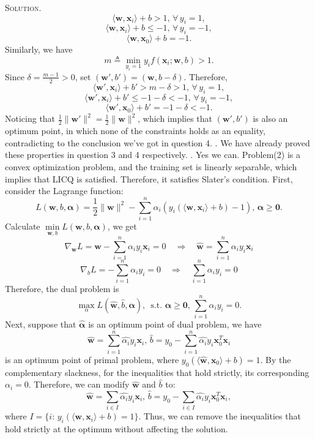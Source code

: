\documentclass[12pt, a4paper, oneside]{ctexart}
\newenvironment{solution}{\par\noindent\textsc{Solution. }}{\\\par}
\begin{document}
\begin{solution}
    \[
    \langle\mathbf{w},\mathbf{x}_i\rangle + b > 1,\, \forall\, y_i = 1,
    \]
    \[
    \langle\mathbf{w},\mathbf{x}_i\rangle + b \leq -1,\, \forall\, y_i = -1,
    \]
    \[
    \langle\mathbf{w},\mathbf{x}_0\rangle + b = -1.
    \]
    Similarly, we have 
    \[
    m \triangleq \min\limits_{y_i = 1} y_i f(\mathbf{x}_i;\mathbf{w},b) > 1.
    \]
    Since $\delta = \frac{m-1}{2} > 0$, set $(\mathbf{w}',b') = (\mathbf{w},b-\delta)$. Therefore,
	\[
    \langle\mathbf{w}',\mathbf{x}_i\rangle + b' > m-\delta > 1,\, \forall\, y_i = 1,
    \]
    \[
    \langle\mathbf{w}',\mathbf{x}_i\rangle + b' \leq -1-\delta < -1,\, \forall\, y_i = -1,
    \]
    \[
    \langle\mathbf{w}',\mathbf{x}_0\rangle + b' = -1-\delta < -1.
    \]
    Noticing that $\frac{1}{2}\|\mathbf{w}'\|^2 = \frac{1}{2}\|\mathbf{w}\|^2$, which implies that $(\mathbf{w}',b')$ is also an optimum point, in which none of the constraints holds as an equality, contradicting to the conclusion we've got in question 4.
    \newline{}. We have already proved these properties in question 3 and 4 respectively.
    \newline{}. Yes we can. Problem(2) is a convex optimization problem, and the training set is linearly separable, which implies that LICQ is satisfied. Therefore, it satisfies Slater's condition. \newline
    First, consider the Lagrange function:
    \[
    L(\mathbf{w},b,\boldsymbol{\alpha}) = \frac{1}{2}\|\mathbf{w}\|^2 - \sum_{i=1}^{n}\alpha_i (y_i(\langle\mathbf{w},\mathbf{x}_i\rangle + b)-1),\, \boldsymbol{\alpha}\geq \mathbf{0}.
    \]
    Calculate $\min\limits_{\mathbf{w},b}L(\mathbf{w},b,\boldsymbol{\alpha})$, we get
    \[
    \nabla_\mathbf{w}L = \mathbf{w} - \sum_{i=1}^{n} \alpha_i y_i \mathbf{x}_i = 0 \quad \Rightarrow \quad \hat{\mathbf{w}} = \sum_{i=1}^{n} \alpha_i y_i \mathbf{x}_i
    \]
    \[
    \nabla_bL = -\sum_{i=1}^{n}\alpha_i y_i = 0 \quad \Rightarrow \quad \sum_{i=1}^{n}\alpha_i y_i = 0
    \]
    Therefore, the dual problem is
    \[
    \max_\alpha L(\hat{\mathbf{w}},\hat{b},\boldsymbol{\alpha}),\, \text{ s.t. } \boldsymbol{\alpha}\geq \mathbf{0},\, \sum_{i=1}^{n}\alpha_i y_i = 0.
    \]
    Next, suppose that $\hat{\boldsymbol{\alpha}}$ is an optimum point of dual problem, we have
    \[
    \hat{\mathbf{w}} = \sum_{i=1}^{n} \hat{\alpha_i}y_i \mathbf{x}_i,\, \hat{b} = y_0 - \sum_{i=1}^{n} \hat{\alpha_i}y_i\mathbf{x}_0^T\mathbf{x}_i
    \]
    is an optimum point of primal problem, where $y_0(\langle\hat{\mathbf{w}},\mathbf{x}_0\rangle + b) = 1$. \newline
    By the complementary slackness, for the inequalities that hold strictly, its corresponding $\alpha_i = 0$. Therefore, we can modify $\hat{\mathbf{w}}$ and $\hat{b}$ to:
    \[
    \hat{\mathbf{w}} = \sum_{i \in I} \hat{\alpha_i} y_i \mathbf{x}_i,\, \hat{b} = y_0 - \sum_{i \in I} \hat{\alpha_i}y_i\mathbf{x}_0^T\mathbf{x}_i,
    \]
    where $I = \{i:\, y_i(\langle\mathbf{w},\mathbf{x}_i\rangle + b) = 1\}$. Thus, we can remove the inequalities that hold strictly at the optimum without affecting the solution.
\end{solution}
\end{document}
